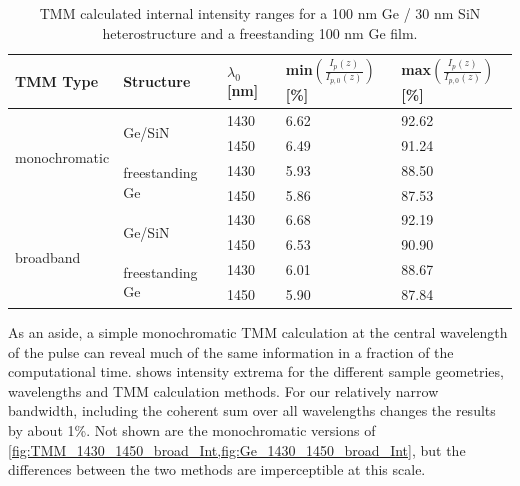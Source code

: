 \begin{table}[]
	\centering
	\begin{tabular}{l|l|l|l|l}
		\textbf{TMM Type} &
		\textbf{Structure} &
		\textbf{$\lambda_0$ {[}nm{]}} &
		\textbf{min$\left(\frac{I_p(z)}{I_{p,0}(z)}\right)$ {[}\%{]}} &
		\textbf{max$\left(\frac{I_p(z)}{I_{p,0}(z)}\right)$ {[}\%{]}} \\ \hline
		\multirow{4}{*}{monochromatic} & \multirow{2}{*}{Ge/SiN}          & 1430 & 6.62 & 92.62 \\
		&                                  & 1450 & 6.49 & 91.24\\ \cline{2-5} 
		& \multirow{2}{*}{freestanding Ge} & 1430 & 5.93 & 88.50 \\
		&                                  & 1450 & 5.86 & 87.53 \\ \hline
		\multirow{4}{*}{broadband}     & \multirow{2}{*}{Ge/SiN}          & 1430 & 6.68 & 92.19 \\
		&                                  & 1450 & 6.53 & 90.90 \\ \cline{2-5} 
		& \multirow{2}{*}{freestanding Ge} & 1430 & 6.01 & 88.67 \\
		&                                  & 1450 & 5.90 & 87.84
	\end{tabular}
	\caption{TMM calculated internal intensity ranges for a 100 nm Ge / 30 nm SiN heterostructure and a freestanding 100 nm Ge film.}
	\label{tab:TMM_intensity_range}
\end{table}

As an aside, a simple monochromatic TMM calculation at the central wavelength of the pulse can reveal much of the same information in a fraction of the computational time.  shows intensity extrema for the different sample geometries, wavelengths and TMM calculation methods. For our relatively narrow bandwidth, including the coherent sum over all wavelengths changes the results by about 1\%. Not shown are the monochromatic versions of \cref{fig:TMM_1430_1450_broad_Int,fig:Ge_1430_1450_broad_Int}, but the differences between the two methods are imperceptible at this scale.

